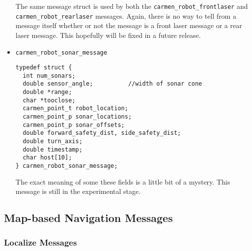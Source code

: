 \documentclass{article}
\begin{document}
\begin{itemize}
The same message struct is used by both the \verb!carmen_robot_frontlaser!
and \verb!carmen_robot_rearlaser!  messages. Again, there is no way to tell
from a message itself whether or not the message is a front laser message or a
rear laser message. This hopefully will be fixed in a future release.

\item \verb!carmen_robot_sonar_message!

\begin{verbatim}
typedef struct {
  int num_sonars;
  double sensor_angle;          //width of sonar cone
  double *range;
  char *tooclose;
  carmen_point_t robot_location;
  carmen_point_p sonar_locations;
  carmen_point_p sonar_offsets;
  double forward_safety_dist, side_safety_dist;
  double turn_axis;
  double timestamp;
  char host[10];
} carmen_robot_sonar_message;
\end{verbatim}

The exact meaning of some these fields is a little bit of a mystery. This
message is still in the experimental stage.

\end{itemize}

\subsection{Map-based Navigation Messages}

\subsubsection{Localize Messages}
\end{document}
